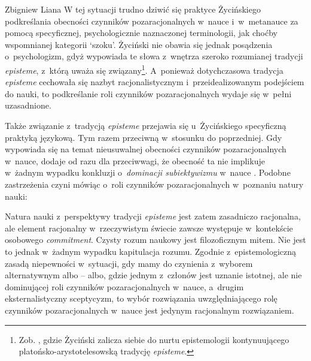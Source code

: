 \begin{artplenv}{Zbigniew Liana}
W tej sytuacji trudno dziwić się praktyce Życińskiego podkreślania obecności czynników pozaracjonalnych w~nauce i~w~metanauce
za pomocą specyficznej, psychologicznie naznaczonej terminologii, jak choćby wspomnianej kategorii `szoku'.
Życiński nie obawia się jednak posądzenia o~psychologizm, gdyż wypowiada te słowa z~wnętrza szeroko rozumianej tradycji
\textit{episteme}, z~którą uważa się związany\footnote{Zob.
\parencite*[s.~126]{zycinski_elementy_1996},
gdzie Życiński zalicza siebie do nurtu epistemologii kontynuującego platońsko-arystotelesowską
tradycję \textit{episteme}.}. A~ponieważ dotychczasowa tradycja \textit{episteme} cechowała się nazbyt racjonalistycznym i~przeidealizowanym
podejściem do nauki, to podkreślanie roli czynników pozaracjonalnych wydaje się w~pełni uzasadnione.

Także związanie z~tradycją \textit{episteme} przejawia się u~Życińskiego specyficzną praktyką językową. Tym razem
przeciwną w~stosunku do poprzedniej. Gdy wypowiada się na temat nieusuwalnej obecności czynników pozaracjonalnych w~nauce,
dodaje od razu  dla przeciwwagi, że obecność ta nie implikuje w~żadnym wypadku konkluzji o~\textit{dominacji
subiektywizmu} w~nauce
\parencite[ s.~187]{zycinski_elementy_1996}.
Podobne zastrzeżenia czyni  mówiąc o~roli
czynników pozaracjonalnych w~poznaniu natury nauki:


Natura nauki z~perspektywy tradycji \textit{episteme} jest zatem zasadniczo racjonalna, ale element racjonalny w~rzeczywistym
świecie zawsze występuje w~kontekście osobowego \textit{commitment}. Czysty rozum naukowy jest filozoficznym
mitem. Nie jest to jednak w~żadnym wypadku kapitulacja rozumu. Zgodnie z~epistemologiczną zasadą niepewności w~sytuacji,
gdy mamy do czynienia z~wyborem alternatywnym albo -- albo, gdzie jednym z~członów jest uznanie istotnej, ale
nie dominującej roli czynników pozaracjonalnych w~nauce, a~drugim eksternalistyczny sceptycyzm, to wybór rozwiązania
uwzględniającego rolę czynników pozaracjonalnych w~nauce jest jedynym racjonalnym rozwiązaniem.






\end{artplenv}
